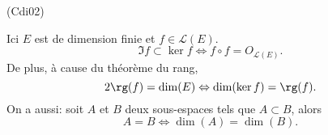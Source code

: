 \begin{tiny}(Cdi02)\end{tiny} Ici $E$ est de dimension finie et $f \in \mathcal{L}(E)$.
\[
  \Im f \subset \ker f \Leftrightarrow f \circ f = O_{\mathcal{L}(E)}.
\]
De plus, à cause du théorème du rang, 
\[
  2 \rg(f) = \dim(E) \Leftrightarrow \dim(\ker f) = \rg(f).
\]
On a aussi: soit $A$ et $B$ deux sous-espaces tels que $A \subset B$, alors
\[
  A = B \Leftrightarrow \dim(A) = \dim(B).
\]
